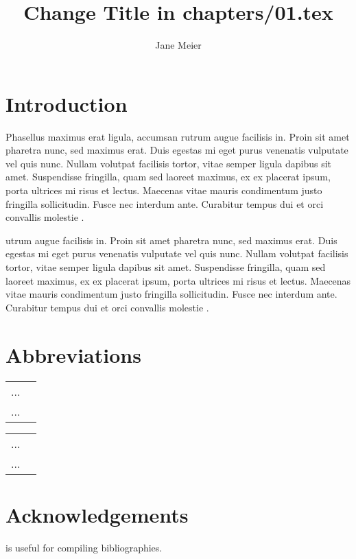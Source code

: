 \documentclass[output=paper,colorlinks,citecolor=brown]{langscibook}
\title{Change Title in chapters/01.tex}
\author{Jane Meier\orcid{}\affiliation{University of Eden}}
\begin{document}
	\maketitle
	
	\section{Introduction} 
	Phasellus maximus erat ligula, accumsan rutrum augue facilisis in. Proin sit amet pharetra nunc, sed maximus erat. Duis egestas mi eget purus venenatis vulputate vel quis nunc. Nullam volutpat facilisis tortor, vitae semper ligula dapibus sit amet. Suspendisse fringilla, quam sed laoreet maximus, ex ex placerat ipsum, porta ultrices mi risus et lectus. Maecenas vitae mauris condimentum justo fringilla sollicitudin. Fusce nec interdum ante. Curabitur tempus dui et orci convallis molestie \citep{Comrie1981}.
	
	utrum augue facilisis in. Proin sit amet pharetra nunc, sed maximus erat. Duis egestas mi eget purus venenatis vulputate vel quis nunc. Nullam volutpat facilisis tortor, vitae semper ligula dapibus sit amet. Suspendisse fringilla, quam sed laoreet maximus, ex ex placerat ipsum, porta ultrices mi risus et lectus. Maecenas vitae mauris condimentum justo fringilla sollicitudin. Fusce nec interdum ante. Curabitur tempus dui et orci convallis molestie \citep{Chomsky1957}.
	
	
	\section*{Abbreviations}
	\begin{tabularx}{.45\textwidth}{lQ}
		... & \\
		... & \\
	\end{tabularx}
	\begin{tabularx}{.45\textwidth}{lQ}
		... & \\
		... & \\
	\end{tabularx}
	
	
	\section*{Acknowledgements}
	\citet{Nordhoff2018} is useful for compiling bibliographies.
	
	
	
	{\sloppy\printbibliography[heading=subbibliography,notkeyword=this]}
\end{document}
